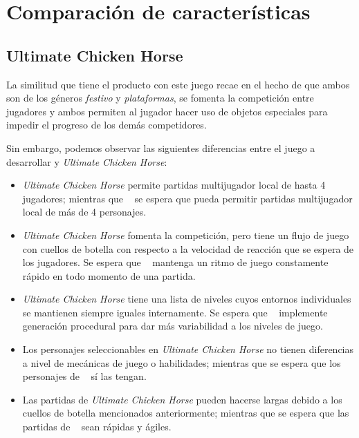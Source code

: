 \section{Comparación de características} %


\subsection{Ultimate Chicken Horse}

La similitud que tiene el producto con este juego recae en el hecho de que ambos
son de los géneros \emph{festivo} y \emph{plataformas}, se fomenta la
competición entre jugadores y ambos permiten al jugador hacer uso de objetos
especiales para impedir el progreso de los demás competidores.

Sin embargo, podemos observar las siguientes diferencias entre el juego a
desarrollar y \emph{Ultimate Chicken Horse}:
\begin{itemize}
    \item \emph{Ultimate Chicken Horse} permite partidas multijugador local de
    hasta 4 jugadores; mientras que \emph{\izenburua\ } se espera que pueda
    permitir partidas multijugador local de más de 4 personajes.
    \item \emph{Ultimate Chicken Horse} fomenta la competición, pero tiene un
    flujo de juego con cuellos de botella con respecto a la velocidad de
    reacción que se espera de los jugadores. Se espera que \emph{\izenburua\ }
    mantenga un ritmo de juego constamente rápido en todo momento de una
    partida.
    \item \emph{Ultimate Chicken Horse} tiene una lista de niveles cuyos
    entornos individuales se mantienen siempre iguales internamente. Se espera
    que \emph{\izenburua\ } implemente generación procedural para dar más
    variabilidad a los niveles de juego.
    \item Los personajes seleccionables en \emph{Ultimate Chicken Horse} no
    tienen diferencias a nivel de mecánicas de juego o habilidades; mientras que
    se espera que los personajes de \emph{\izenburua\ } sí las tengan.
    \item Las partidas de \emph{Ultimate Chicken Horse} pueden hacerse largas
    debido a los cuellos de botella mencionados anteriormente; mientras que se
    espera que las partidas de \emph{\izenburua\ } sean rápidas y ágiles.
\end{itemize}


